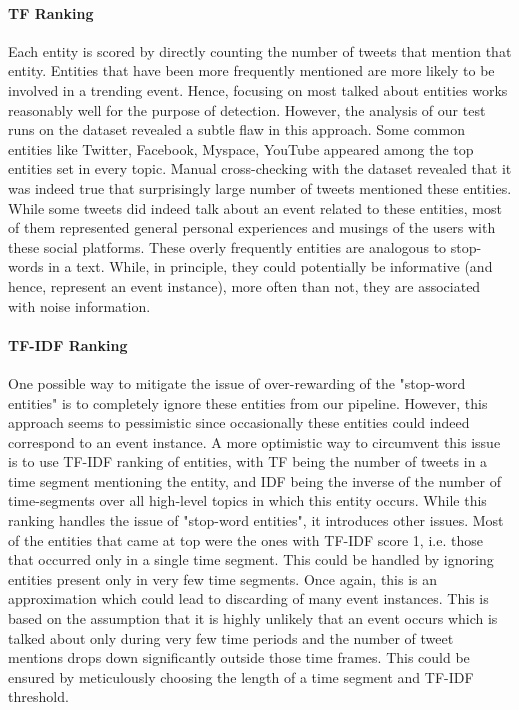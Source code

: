 \paragraph{TF Ranking}
Each entity is scored by directly counting the number of tweets that mention that entity. Entities that have been more frequently mentioned are more likely to be involved in a trending event. Hence, focusing on most talked about entities works reasonably well for the purpose of detection. However, the analysis of our test runs on the dataset revealed a subtle flaw in this approach. Some common entities like Twitter, Facebook, Myspace, YouTube appeared among the top entities set in every topic. Manual cross-checking with the dataset revealed that it was indeed true that surprisingly large number of tweets mentioned these entities. While some tweets did indeed talk about an event related to these entities, most of them represented general personal experiences and musings of the users with these social platforms. These overly frequently entities are analogous to stop-words in a text. While, in principle, they could potentially be informative (and hence, represent an event instance), more often than not, they are associated with noise information.

\paragraph{TF-IDF Ranking}
One possible way to mitigate the issue of over-rewarding of the "stop-word entities" is to completely ignore these entities from our pipeline. However, this approach seems to pessimistic since occasionally these entities could indeed correspond to an event instance. A more optimistic way to circumvent this issue is to use TF-IDF ranking of entities, with TF being the number of tweets in a time segment mentioning the entity, and IDF being the inverse of the number of time-segments over all high-level topics in which this entity occurs. While this ranking handles the issue of "stop-word entities", it introduces other issues. Most of the entities that came at top were the ones with TF-IDF score 1, i.e. those that occurred only in a single time segment. This could be handled by ignoring entities present only in very few time segments. Once again, this is an approximation which could lead to discarding of many event instances. This is based on the assumption that it is highly unlikely that an event occurs which is talked about only during very few time periods and the number of tweet mentions drops down significantly outside those time frames. This could be ensured by meticulously choosing the length of a time segment and TF-IDF threshold.

